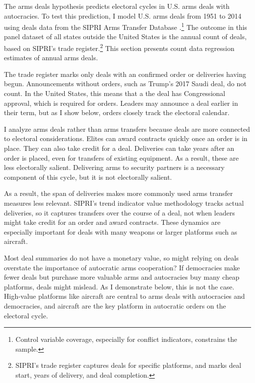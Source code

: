 \documentclass[12pt]{article}
\begin{document}
The arms deals hypothesis predicts electoral cycles in U.S. arms deals with autocracies.
To test this prediction, I model U.S. arms deals from 1951 to 2014 using deals data from the SIPRI Arms Transfer Database \citep{SIPRI2021}.\footnote{Control variable coverage, especially for conflict indicators, constrains the sample.}
The outcome in this panel dataset of all states outside the United States is the annual count of deals, based on SIPRI's trade register.\footnote{SIPRI's trade register captures deals for specific platforms, and marks deal start, years of delivery, and deal completion.}
This section presents count data regression estimates of annual arms deals. 


The trade register marks only deals with an confirmed order or deliveries having begun. 
Announcements without orders, such as Trump's 2017 Saudi deal, do not count. 
In the United States, this means that a the deal has Congressional approval, which is required for orders. 
Leaders may announce a deal earlier in their term, but as I show below, orders closely track the electoral calendar. 


I analyze arms deals rather than arms transfers because deals are more connected to electoral considerations.
Elites can award contracts quickly once an order is in place.
They can also take credit for a deal. 
 Deliveries can take years after an order is placed, even for transfers of existing equipment. 
As a result, these are less electorally salient. 
Delivering arms to security partners is a necessary component of this cycle, but it is not electorally salient. 


As a result, the span of deliveries makes more commonly used arms transfer measures less relevant.
SIPRI's trend indicator value methodology tracks actual deliveries, so it captures transfers over the course of a deal, not when leaders might take credit for an order and award contracts.
These dynamics are especially important for deals with many weapons or larger platforms such as aircraft. 


Most deal summaries do not have a monetary value, so might relying on deals overstate the importance of autocratic arms cooperation? 
If democracies make fewer deals but purchase more valuable arms and autocracies buy many cheap platforms, deals might mislead. 
As I demonstrate below, this is not the case. 
High-value platforms like aircraft are central to arms deals with autocracies and democracies, and aircraft are the key platform in autocratic orders on the electoral cycle. 
\end{document}

